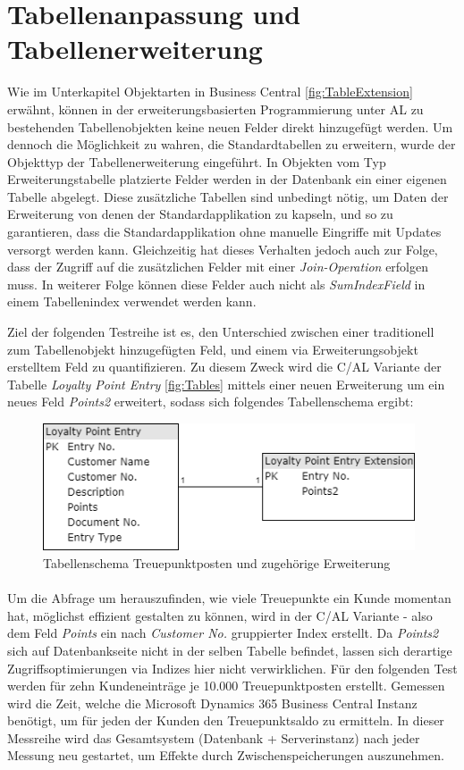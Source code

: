 \section{Tabellenanpassung und Tabellenerweiterung}
Wie im Unterkapitel Objektarten in Business Central \ref{fig:TableExtension} erwähnt, können in der erweiterungsbasierten Programmierung unter AL zu bestehenden Tabellenobjekten keine neuen Felder direkt hinzugefügt werden. Um  dennoch die Möglichkeit zu wahren, die Standardtabellen zu erweitern, wurde der Objekttyp der Tabellenerweiterung eingeführt. In Objekten vom Typ Erweiterungstabelle platzierte Felder werden in der Datenbank ein einer eigenen Tabelle abgelegt. Diese zusätzliche Tabellen sind unbedingt nötig, um Daten der Erweiterung von denen der Standardapplikation zu kapseln, und so zu garantieren, dass die Standardapplikation ohne manuelle Eingriffe mit Updates versorgt werden kann. Gleichzeitig hat dieses Verhalten jedoch auch zur Folge, dass der Zugriff auf die zusätzlichen Felder mit einer \textit{Join-Operation} erfolgen muss. In weiterer Folge können diese Felder auch nicht als \textit{SumIndexField} in einem Tabellenindex verwendet werden kann. 

Ziel der folgenden Testreihe ist es, den Unterschied zwischen einer traditionell zum Tabellenobjekt hinzugefügten Feld, und einem via Erweiterungsobjekt erstelltem Feld zu quantifizieren. Zu diesem Zweck wird die C/AL Variante der Tabelle \textit{Loyalty Point Entry} \ref{fig:Tables} mittels einer neuen Erweiterung um ein neues Feld \textit{Points2} erweitert, sodass sich folgendes Tabellenschema ergibt:

\begin{figure}[H]
	\centering
	\includegraphics[width=110mm]{images/Test2}
	\caption{Tabellenschema Treuepunktposten und zugehörige Erweiterung}
	\label{fig:Test2Schema}
\end{figure}

\paragraph{}
Um die Abfrage um herauszufinden, wie viele Treuepunkte ein Kunde momentan hat, möglichst effizient gestalten zu können, wird in der C/AL Variante - also dem Feld \textit{Points} ein nach \textit{Customer No.} gruppierter Index erstellt. Da \textit{Points2} sich auf Datenbankseite nicht in der selben Tabelle befindet, lassen sich derartige Zugriffsoptimierungen via Indizes hier nicht verwirklichen. Für den folgenden Test werden für zehn Kundeneinträge je 10.000 Treuepunktposten erstellt. Gemessen wird die Zeit, welche die Microsoft Dynamics 365 Business Central Instanz benötigt, um für jeden der Kunden den Treuepunktsaldo zu ermitteln. In dieser Messreihe wird das Gesamtsystem (Datenbank + Serverinstanz) nach jeder Messung neu gestartet, um Effekte durch Zwischenspeicherungen auszunehmen.

